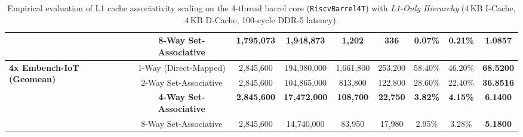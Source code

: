 \begin{table}[htbp]
{\begin{tabular}{|l|c|c|c|c|c|c|c|c|}
 & 8-Way Set-Associative & 1,795,073 & 1,948,873 & 1,202 & 336 & 0.07\% & 0.21\% & \textbf{1.0857} \\ \hline\hline
\multirow{4}{*}{\textbf{4x Embench-IoT (Geomean)}} 
 & 1-Way (Direct-Mapped) & 2,845,600 & 194,980,000 & 1,661,800 & 253,200 & 58.40\% & 46.20\% & \textbf{68.5200} \\ \cline{2-9}
 & 2-Way Set-Associative & 2,845,600 & 104,865,000 & 813,800 & 122,800 & 28.60\% & 22.40\% & \textbf{36.8516} \\ \cline{2-9}
 & \textbf{4-Way Set-Associative} & \textbf{2,845,600} & \textbf{17,472,000} & \textbf{108,700} & \textbf{22,750} & \textbf{3.82\%} & \textbf{4.15\%} & \textbf{6.1400} \\ \cline{2-9}
 & 8-Way Set-Associative & 2,845,600 & 14,740,000 & 83,950 & 17,980 & 2.95\% & 3.28\% & \textbf{5.1800} \\ \hline
\end{tabular}%
}
\caption{Empirical evaluation of L1 cache associativity scaling on the 4-thread barrel core (\texttt{RiscvBarrel4T}) with \textit{L1-Only Hierarchy} ($4\,\text{KB}$ I-Cache, $4\,\text{KB}$ D-Cache, 100-cycle DDR-5 latency).}
\label{tab:mt_cache_l1_only}
\end{table}

